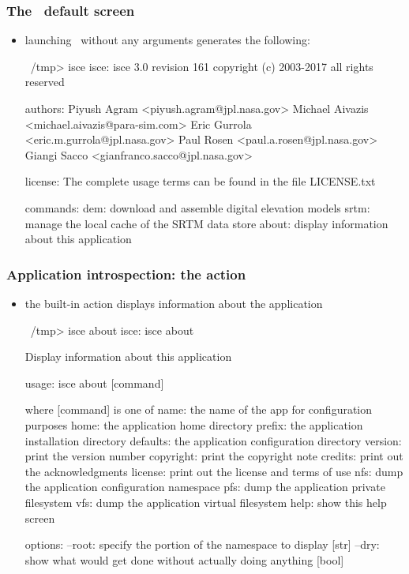 \begin{frame}[fragile]
%
  \frametitle{The \isce\ default screen}
%
  \begin{itemize}
%
  \item launching \isce\ without any arguments generates the following:
%
    \begin{ish}[gobble=4]{}
      ~/tmp> isce
      isce:
          isce 3.0 revision 161
          copyright (c) 2003-2017 all rights reserved

      authors:
          Piyush Agram        <piyush.agram@jpl.nasa.gov>
          Michael Aivazis     <michael.aivazis@para-sim.com>
          Eric Gurrola        <eric.m.gurrola@jpl.nasa.gov>
          Paul Rosen          <paul.a.rosen@jpl.nasa.gov>
          Giangi Sacco        <gianfranco.sacco@jpl.nasa.gov>

      license:
          The complete usage terms can be found in the file LICENSE.txt

      commands:
            dem: download and assemble digital elevation models
           srtm: manage the local cache of the SRTM data store
          about: display information about this application
    \end{ish}
%
  \end{itemize}
%
\end{frame}

\begin{frame}[fragile]
%
  \frametitle{Application introspection: the action }
%
  \begin{itemize}
%
  \item the built-in action  displays information about the application
%
    \begin{ish}[gobble=4]{}
      ~/tmp> isce about
      isce: isce about

          Display information about this application

      usage:
          isce about [command]

      where [command] is one of
               name: the name of the app for configuration purposes
               home: the application home directory
             prefix: the application installation directory
           defaults: the application configuration directory
            version: print the version number
          copyright: print the copyright note
            credits: print out the acknowledgments
            license: print out the license and terms of use
                nfs: dump the application configuration namespace
                pfs: dump the application private filesystem
                vfs: dump the application virtual filesystem
               help: show this help screen

      options:
          --root: specify the portion of the namespace to display [str]
           --dry: show what would get done without actually doing anything [bool]
    \end{ish}
%
  \end{itemize}
%
\end{frame}

